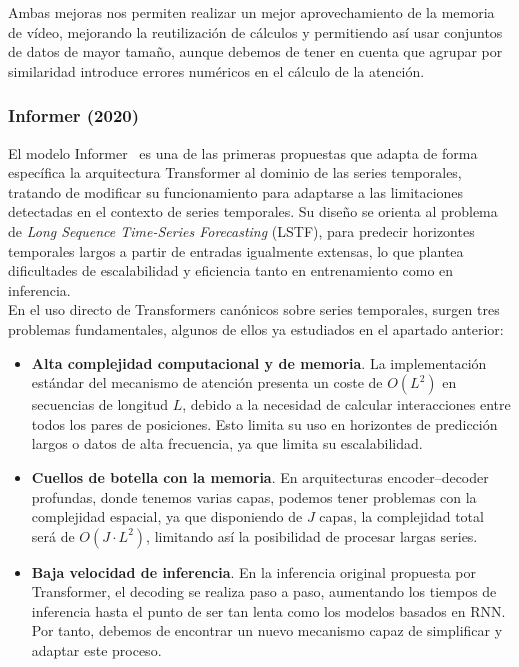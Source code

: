 Ambas mejoras nos permiten realizar un mejor aprovechamiento de la memoria de vídeo, mejorando la reutilización de cálculos y permitiendo así usar conjuntos de datos de mayor tamaño, aunque debemos de tener en cuenta que agrupar por similaridad introduce errores numéricos en el cálculo de la atención.

\subsubsection{Informer (2020)}

El modelo Informer~\cite{zhou2021informerefficienttransformerlong} es una de las primeras propuestas que adapta de forma específica la arquitectura Transformer al dominio de las series temporales, tratando de modificar su funcionamiento para adaptarse a las limitaciones detectadas en el contexto de series temporales. Su diseño se orienta al problema de \textit{Long Sequence Time-Series Forecasting} (LSTF), para predecir horizontes temporales largos a partir de entradas igualmente extensas, lo que plantea dificultades de escalabilidad y eficiencia tanto en entrenamiento como en inferencia.\\

En el uso directo de Transformers canónicos sobre series temporales, surgen tres problemas fundamentales, algunos de ellos ya estudiados en el apartado anterior:

\begin{itemize}
    \item \textbf{Alta complejidad computacional y de memoria}. La implementación estándar del mecanismo de atención presenta un coste de $O(L^2)$ en secuencias de longitud $L$, debido a la necesidad de calcular interacciones entre todos los pares de posiciones. Esto limita su uso en horizontes de predicción largos o datos de alta frecuencia, ya que limita su escalabilidad.
    \item \textbf{Cuellos de botella con la memoria}. En arquitecturas encoder–decoder profundas, donde tenemos varias capas, podemos tener problemas con la complejidad espacial, ya que disponiendo de $J$ capas, la complejidad total será de $O(J \cdot L^2)$, limitando así la posibilidad de procesar largas series.
    \item \textbf{Baja velocidad de inferencia}. En la inferencia original propuesta por Transformer, el decoding se realiza paso a paso, aumentando los tiempos de inferencia hasta el punto de ser tan lenta como los modelos basados en RNN. Por tanto, debemos de encontrar un nuevo mecanismo capaz de simplificar y adaptar este proceso.
\end{itemize}

